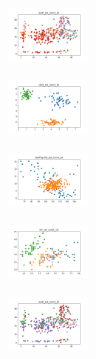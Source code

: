 \begin{figure}[H]
    \begin{subfigure}
        \centering
        \includegraphics[width=0.234\textwidth]{img/aggsf/ecoli_set_const_10_277451237_clust.png}
    \end{subfigure}
    \hfill
    \begin{subfigure}
        \centering
        \includegraphics[width=0.234\textwidth]{img/aggsf/rand_set_const_10_277451237_clust.png}
    \end{subfigure}
    \hfill
    \begin{subfigure}
        \centering
        \includegraphics[width=0.234\textwidth]{img/aggsf/newthyroid_set_const_10_277451237_clust.png}
    \end{subfigure}
    \hfill
    \begin{subfigure}
        \centering
        \includegraphics[width=0.234\textwidth]{img/aggsf/iris_set_const_10_49258669_clust.png}
    \end{subfigure}
    \hfill
    \begin{subfigure}
        \centering
        \includegraphics[width=0.234\textwidth]{img/aggsf/ecoli_set_const_10_49258669_clust.png}
    \end{subfigure}
    \hfill
    \begin{subfigure}
        \centering

\end{subfigure}
\end{figure}
